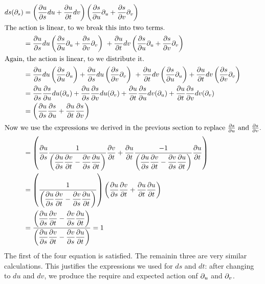 \documentclass[fleqn,letterpaper]{report}
\begin{document}
\begin{align*}
ds(\partial_s) & = \left( \frac{\partial u}{\partial s} du + 
\frac{\partial u}{\partial t} dv \right) \left( \frac{\partial s}{\partial u} \partial_u + 
\frac{\partial s}{\partial v} \partial_v \right) \\
\intertext{The action is linear, to we break this into two
terms.} 
& = \frac{\partial u}{\partial s} du 
\left( \frac{\partial s}{\partial u} \partial_u + 
\frac{\partial s}{\partial v} \partial_v \right) \
+ \frac{\partial u}{\partial t} dv 
\left( \frac{\partial s}{\partial u} \partial_u + 
\frac{\partial s}{\partial v} \partial_v \right) \\
\intertext{Again, the action is linear, to we distribute it.}
& = \frac{\partial u}{\partial s} du 
\left( \frac{\partial s}{\partial u} \partial_u \right)
+ \frac{\partial u}{\partial s} du 
\left( \frac{\partial s}{\partial v} \partial_v \right) \
+ \frac{\partial u}{\partial t} dv 
\left( \frac{\partial s}{\partial u} \partial_u \right)
+ \frac{\partial u}{\partial t} dv 
\left( \frac{\partial s}{\partial v} \partial_v \right) \\
& = \frac{\partial u}{\partial s} \frac{\partial s}{\partial u} du(\partial_u) 
+ \frac{\partial u}{\partial s} \frac{\partial s}{\partial v} du(\partial_v) 
+ \frac{\partial u}{\partial t} \frac{\partial s}{\partial u} dv(\partial_u) 
+ \frac{\partial u}{\partial t} \frac{\partial s}{\partial v} dv(\partial_v) \\
& = \left( \frac{\partial u}{\partial s} \frac{\partial s}{\partial u} +
\frac{\partial u}{\partial t} \frac{\partial s}{\partial v} \right) \\
\intertext{Now we use the expressions we derived in the
previous section to replace $\frac{\partial s}{\partial u}$ and
$\frac{\partial s}{\partial v}$.}
& = \left( \frac{\partial u}{\partial s} \frac{1}{ \left( \dfrac{\partial
u}{\partial s} \dfrac{\partial v}{\partial t} - \dfrac{\partial v}{\partial s}
\dfrac{\partial u}{\partial t} \right) } \dfrac{\partial v}{\partial t} +
\frac{\partial u}{\partial t} \frac{-1}{ \left( \dfrac{\partial u}{\partial s}
\dfrac{\partial v}{\partial t} - \dfrac{\partial v}{\partial s} \dfrac{\partial
u}{\partial t} \right) } \dfrac{\partial u}{\partial t} \right) \\
& = \left( \frac{1}{ \left( \dfrac{\partial u}{\partial s} \dfrac{\partial
v}{\partial t} - \dfrac{\partial v}{\partial s} \dfrac{\partial u}{\partial t}
\right) } \right) \left( \frac{\partial u}{\partial s} \dfrac{\partial
v}{\partial t} + \frac{\partial u}{\partial t} \dfrac{\partial u}{\partial t}
\right) \\
& = 
\frac{\left( \dfrac{\partial u}{\partial s} \dfrac{\partial v}{\partial t}
- \dfrac{\partial v}{\partial s} \dfrac{\partial u}{\partial t}
 \right)}{\left( \dfrac{\partial u}{\partial s} \dfrac{\partial v}{\partial
t} - \dfrac{\partial v}{\partial s} \dfrac{\partial u}{\partial t} \right)}
= 1
\end{align*}
The first of the four equation is satisfied. The remainin
three are very similar calculations. This justifies the
expressions we used for $ds$ and $dt$: after changing to $du$
and $dv$, we produce the require and expected action onf
$\partial_u$ and $\partial_v$. 
\end{document}
